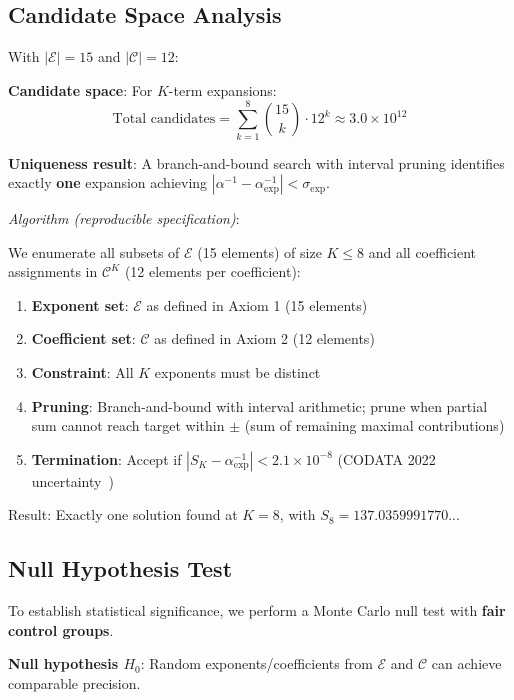 \documentclass[11pt,a4paper]{article}
\begin{document}
\subsection{Candidate Space Analysis}

With $|\mathcal{E}| = 15$ and $|\mathcal{C}| = 12$:

\textbf{Candidate space}: For $K$-term expansions:
\begin{equation}
\text{Total candidates} = \sum_{k=1}^{8} \binom{15}{k} \cdot 12^k \approx 3.0 \times 10^{12}
\end{equation}

\textbf{Uniqueness result}: A branch-and-bound search with interval pruning identifies exactly \textbf{one} expansion achieving $|\alpha^{-1} - \alpha^{-1}_{\exp}| < \sigma_{\exp}$.

\textit{Algorithm (reproducible specification)}:

We enumerate all subsets of $\mathcal{E}$ (15 elements) of size $K \leq 8$ and all coefficient assignments in $\mathcal{C}^K$ (12 elements per coefficient):
\begin{enumerate}
\item \textbf{Exponent set}: $\mathcal{E}$ as defined in Axiom 1 (15 elements)
\item \textbf{Coefficient set}: $\mathcal{C}$ as defined in Axiom 2 (12 elements)
\item \textbf{Constraint}: All $K$ exponents must be distinct
\item \textbf{Pruning}: Branch-and-bound with interval arithmetic; prune when partial sum cannot reach target within $\pm$ (sum of remaining maximal contributions)
\item \textbf{Termination}: Accept if $|S_K - \alpha^{-1}_{\exp}| < 2.1 \times 10^{-8}$ (CODATA 2022 uncertainty~\cite{CODATA2022})
\end{enumerate}
Result: Exactly one solution found at $K=8$, with $S_8 = 137.0359991770...$

\subsection{Null Hypothesis Test}

To establish statistical significance, we perform a Monte Carlo null test with \textbf{fair control groups}.

\textbf{Null hypothesis $H_0$}: Random exponents/coefficients from $\mathcal{E}$ and $\mathcal{C}$ can achieve comparable precision.
\end{document}
